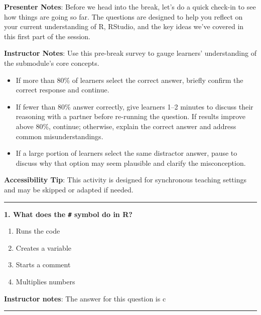 \documentclass[
  letterpaper,
  DIV=11,
  numbers=noendperiod]{scrartcl}
\providecommand{\tightlist}{%
  \setlength{\itemsep}{0pt}\setlength{\parskip}{0pt}}
\begin{document}
\textbf{Presenter Notes}: Before we head into the break, let's do a
quick check-in to see how things are going so far. The questions are
designed to help you reflect on your current understanding of R,
RStudio, and the key ideas we've covered in this first part of the
session.

\textbf{Instructor Notes}: Use this pre-break survey to gauge learners'
understanding of the submodule's core concepts.

\begin{itemize}
\item
  If more than 80\% of learners select the correct answer, briefly
  confirm the correct response and continue.
\item
  If fewer than 80\% answer correctly, give learners 1--2 minutes to
  discuss their reasoning with a partner before re-running the question.
  If results improve above 80\%, continue; otherwise, explain the
  correct answer and address common misunderstandings.
\item
  If a large portion of learners select the same distractor answer,
  pause to discuss why that option may seem plausible and clarify the
  misconception.
\end{itemize}

\textbf{Accessibility Tip}: This activity is designed for synchronous
teaching settings and may be skipped or adapted if needed.

\begin{center}\rule{0.5\linewidth}{0.5pt}\end{center}

\textbf{1. What does the \texttt{\#} symbol do in R?}

\begin{enumerate}
\def\labelenumi{\alph{enumi}.}
\tightlist
\item
  Runs the code\\
\item
  Creates a variable\\
\item
  Starts a comment\\
\item
  Multiplies numbers
\end{enumerate}

\textbf{Instructor notes}: The answer for this question is c

\begin{center}\rule{0.5\linewidth}{0.5pt}\end{center}
\end{document}

